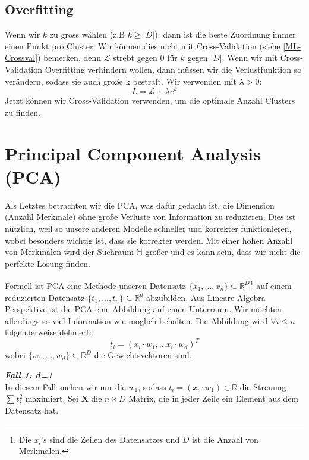 \subsection{Overfitting}
Wenn wir $k$ zu gross wählen (z.B  $k \geq |D|$), dann ist die beste Zuordnung immer einen Punkt pro Cluster. Wir können dies  nicht mit Cross-Validation (siehe \ref{ML-Crossval}) bemerken, denn $\mathcal{L}$ strebt gegen 0 für $k$ gegen $|D|$. Wenn wir mit Cross-Validation Overfitting verhindern wollen, dann müssen wir die Verlustfunktion so verändern, sodass sie auch große k bestraft. Wir verwenden mit $\lambda > 0$:
\begin{equation}
    L = \mathcal{L} + \lambda e^k
\end{equation}
Jetzt können wir Cross-Validation verwenden, um die optimale Anzahl Clusters zu finden. 

\section{Principal Component Analysis (PCA)}
Als Letztes betrachten wir die PCA, was dafür gedacht ist, die Dimension (Anzahl Merkmale) ohne große Verluste von Information zu reduzieren. Dies ist nützlich, weil so unsere anderen Modelle schneller und korrekter funktionieren, wobei besonders wichtig ist, dass sie korrekter werden. Mit einer hohen Anzahl von Merkmalen wird der Suchraum $\mathbb{H}$ größer und es kann sein, dass wir nicht die perfekte Lösung finden.

Formell ist PCA eine Methode unseren Datensatz $\{x_1,...,x_n\} \subseteq \mathbb{R}^D$\footnote{Die $x_i$'s sind die Zeilen des Datensatzes und  $D$ ist die Anzahl von Merkmalen. } auf einem reduzierten Datensatz $\{t_1,...,t_n\} \subseteq \mathbb{R}^d$ abzubilden. Aus Lineare Algebra Perspektive ist die PCA eine Abbildung auf einen Unterraum. Wir möchten allerdings  so viel Information wie möglich behalten. Die Abbildung wird $\forall i \leq n$ folgenderweise definiert:
\begin{equation}
    t_i = (x_i \cdot w_1 ,... x_i \cdot w_d)^T
\end{equation}
wobei $\{w_1,...,w_d\} \subseteq \mathbb{R}^D$ die Gewichtsvektoren sind. 

\textbf{\textit{Fall 1: d=1}}\\


In diesem Fall suchen wir nur die $w_1$, sodass $t_i = (x_i \cdot w_1) \in \mathbb{R}$ die  Streuung  $\sum t_i^2$ maximiert. Sei \textbf{X} die $n\times D$ Matrix, die in jeder Zeile ein Element aus dem Datensatz hat.

